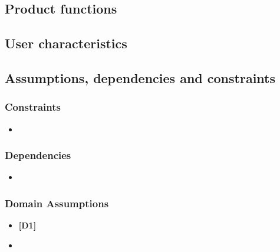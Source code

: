 \documentclass {article}
\begin{document}
	\subsection{Product functions}
		
	\subsection{User characteristics}
	
	\subsection{Assumptions, dependencies and constraints}
		\subsubsection{Constraints}
		\begin{itemize}
		\item		
		\end{itemize}
		\subsubsection{Dependencies}
		\begin{itemize}
		\item 
		\end{itemize}
		
		\subsubsection{Domain Assumptions}
		\begin{itemize}
		 \item {\bf [D1]}  
		 \item 		\end{itemize}
		
\pagebreak	


	
\end{document}
